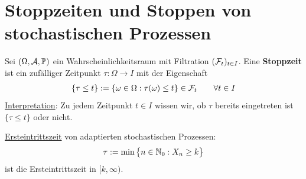 
\chapter{Stoppzeiten und Stoppen von stochastischen Prozessen} %
\begin{defi}[Stoppzeit]\enter
Sei $(\Omega,\mathcal{A},\mathbb{P})$ ein Wahrscheinlichkeitsraum mit Filtration $(\mathcal{F}_t)_{t\in I}$. Eine \textbf{Stoppzeit} ist ein zufälliger Zeitpunkt $\tau:\Omega\to I$ mit der Eigenschaft
\begin{align*}
\lbrace\tau\leq t\rbrace:=\lbrace\omega\in\Omega:\tau(\omega)\leq t\rbrace\in\mathcal{F}_t\qquad\forall t\in I
\end{align*}
\ul{Interpretation}: Zu jedem Zeitpunkt $t\in I$ wissen wir, ob $\tau$ bereits eingetreten ist $\lbrace\tau\leq t\rbrace$ oder nicht.
\end{defi}

\begin{beisp}\enter
\ul{Ersteintrittszeit} von adaptierten stochastischen Prozessen:
\begin{align*}
\tau:=\min\big\lbrace n\in\mathbb{N}_0:X_n\geq k\big\rbrace
\end{align*}
ist die Ersteintrittszeit in $[k,\infty)$.
\end{beisp}

